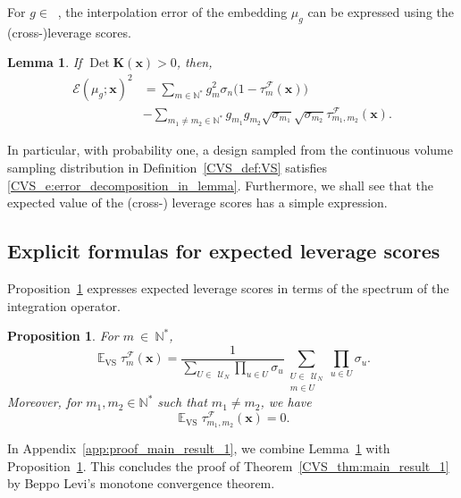 \documentclass[twoside,11pt]{book}
\newtheorem{proposition}{Proposition}
\newtheorem{lemma}{Lemma}
\numberwithin{theorem}{chapter}
\numberwithin{definition}{chapter}
\numberwithin{proposition}{chapter}
\numberwithin{corollary}{chapter}
\numberwithin{example}{chapter}
\numberwithin{lemma}{chapter}
\DeclareMathOperator{\Det}{Det}
\DeclareMathOperator{\VS}{\mathrm{VS}}
\DeclareMathOperator{\EX}{\mathbb{E}}
\DeclareMathOperator{\F}{\mathcal{F}}
\DeclareMathOperator{\Ltwo}{\mathbb{L}_{2}(\mathrm{d} \omega)}
\def\UN{\:\mathcal{U}_N}
\begin{document}
For $g \in \Ltwo$, the interpolation error of the embedding $\mu_{g}$ can be expressed using the (cross-)leverage scores.
\begin{lemma}\label{CVS_lemma:error_decomposition}
If $\Det \bm{K}(\bm{x}) > 0$, then,
\begin{align}
\label{CVS_e:error_decomposition_in_lemma}
\mathcal{E}(\mu_{g};\bm{x})^{2} & = \sum\limits_{m \in \mathbb{N}^{*}}  g_{m}^{2} \sigma_{n}\bigg(1- \tau_{m}^{\F}(\bm{x})\bigg)\\
 & - \sum\limits_{m_{1}\neq m_{2} \in \mathbb{N}^{*}}  g_{m_{1}}g_{m_{2}} \sqrt{\sigma_{m_{1}}} \sqrt{\sigma_{m_{2}}} \tau_{m_{1},m_{2}}^{\F}(\bm{x}). \nonumber
\end{align}
\end{lemma}
In particular, with probability one, a design sampled from the continuous volume sampling distribution in Definition~\ref{CVS_def:VS} satisfies \eqref{CVS_e:error_decomposition_in_lemma}. Furthermore, we shall see that the expected value of the (cross-) leverage scores has a simple expression.


\subsection{Explicit formulas for expected leverage scores}
\label{CVS_sec:closed_formulas}
Proposition~\ref{CVS_prop:EX_VS_lvs} expresses expected leverage scores in terms of the spectrum of the integration operator.
\begin{proposition}\label{CVS_prop:EX_VS_lvs}
For $m~\in~\mathbb{N}^{*}$,
\begin{equation}\label{CVS_eq:lvs_formula}
\EX_{\VS} \tau_{m}^{\F}(\bm{x})  = \frac{1}{\sum\limits_{U \in \: \UN} \prod\limits_{u \in U}\sigma_{u}}  \sum\limits_{\substack{U \in \: \UN \\ m \in U}} \prod\limits_{u \in U}\sigma_{u}.
\end{equation}
Moreover, for $m_{1},m_{2} \in \mathbb{N}^{*}$ such that $m_{1} \neq m_{2}$, we have
\begin{equation}\label{CVS_eq:cross_lvs_zero}
\EX_{\VS} \tau_{m_{1},m_{2}}^{\F}(\bm{x}) = 0.
\end{equation}
\end{proposition}

In Appendix~\ref{app:proof_main_result_1}, we combine Lemma~\ref{CVS_lemma:error_decomposition} with Proposition~\ref{CVS_prop:EX_VS_lvs}. This concludes the proof of Theorem~\ref{CVS_thm:main_result_1} by Beppo Levi's monotone convergence theorem.
\end{document}
